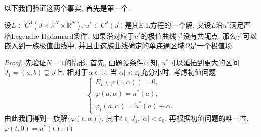 以下我们验证这两个事实, 首先是第一个.

\begin{proposition}\label{prop1.25}
    设$L \in C^3(J \times \mathbb{R}^N \times \mathbb{R}^N), u^* \in C^2(J)$是其E-L方程的一个解. 又设$L$沿$u^*$满足严格Legendre-Hadamard条件.
    如果沿对应于$u^*$的极值曲线$\gamma^*$没有共轭点, 那么$\gamma^*$可以嵌入到一族极值曲线中, 并且由这族曲线确定的单连通区域$\Omega$是一个极值场.
    \begin{proof}
        先验证$N = 1$的情形. 首先, 由题设条件可知, $u^*$可以延拓到更大的区间$J_1 = (a, b) \supseteq J$上.
        相对于$\alpha \in \mathbb{R}$, 当$|\alpha| < \varepsilon_0$充分小时, 考虑初值问题 
        \begin{equation*}
            \begin{cases} 
                E_L(\varphi(\cdot, \alpha)) = 0, \\  
                \varphi(a, \alpha) = u^*(a), \\  
                \varphi_t(a, \alpha) = \dot u^*(a) + \alpha. 
            \end{cases}
        \end{equation*}
        由此我们得到一族解$\{\varphi(t, \alpha)\}$, 其中$t \in J_1, |\alpha| < \varepsilon_0$.
        再根据初值问题的唯一性, $\varphi(t, 0) = u^*(t)$.


\end{proof}
\end{proposition}
